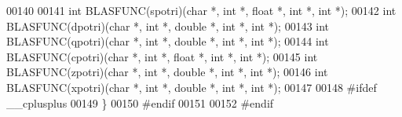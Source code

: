 \begin{DoxyCode}
00140 
00141 \textcolor{keywordtype}{int} BLASFUNC(spotri)(\textcolor{keywordtype}{char} *, \textcolor{keywordtype}{int} *, \textcolor{keywordtype}{float}  *, \textcolor{keywordtype}{int} *, \textcolor{keywordtype}{int} *);
00142 \textcolor{keywordtype}{int} BLASFUNC(dpotri)(\textcolor{keywordtype}{char} *, \textcolor{keywordtype}{int} *, \textcolor{keywordtype}{double} *, \textcolor{keywordtype}{int} *, \textcolor{keywordtype}{int} *);
00143 \textcolor{keywordtype}{int} BLASFUNC(qpotri)(\textcolor{keywordtype}{char} *, \textcolor{keywordtype}{int} *, \textcolor{keywordtype}{double} *, \textcolor{keywordtype}{int} *, \textcolor{keywordtype}{int} *);
00144 \textcolor{keywordtype}{int} BLASFUNC(cpotri)(\textcolor{keywordtype}{char} *, \textcolor{keywordtype}{int} *, \textcolor{keywordtype}{float}  *, \textcolor{keywordtype}{int} *, \textcolor{keywordtype}{int} *);
00145 \textcolor{keywordtype}{int} BLASFUNC(zpotri)(\textcolor{keywordtype}{char} *, \textcolor{keywordtype}{int} *, \textcolor{keywordtype}{double} *, \textcolor{keywordtype}{int} *, \textcolor{keywordtype}{int} *);
00146 \textcolor{keywordtype}{int} BLASFUNC(xpotri)(\textcolor{keywordtype}{char} *, \textcolor{keywordtype}{int} *, \textcolor{keywordtype}{double} *, \textcolor{keywordtype}{int} *, \textcolor{keywordtype}{int} *);
00147 
00148 \textcolor{preprocessor}{#ifdef \_\_cplusplus}
00149 \}
00150 \textcolor{preprocessor}{#endif}
00151 
00152 \textcolor{preprocessor}{#endif}
\end{DoxyCode}
